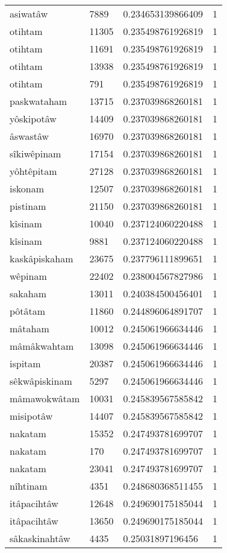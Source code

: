 \begin{longtable}{llll}
asiwatâw & 7889 & 0.234653139866409 & 1 \\
otihtam & 11305 & 0.235498761926819 & 1 \\
otihtam & 11691 & 0.235498761926819 & 1 \\
otihtam & 13938 & 0.235498761926819 & 1 \\
otihtam & 791 & 0.235498761926819 & 1 \\
paskwataham & 13715 & 0.237039868260181 & 1 \\
yôskipotâw & 14409 & 0.237039868260181 & 1 \\
âswastâw & 16970 & 0.237039868260181 & 1 \\
sîkiwêpinam & 17154 & 0.237039868260181 & 1 \\
yôhtêpitam & 27128 & 0.237039868260181 & 1 \\
iskonam & 12507 & 0.237039868260181 & 1 \\
pistinam & 21150 & 0.237039868260181 & 1 \\
kîsinam & 10040 & 0.237124060220488 & 1 \\
kîsinam & 9881 & 0.237124060220488 & 1 \\
kaskâpiskaham & 23675 & 0.237796111899651 & 1 \\
wêpinam & 22402 & 0.238004567827986 & 1 \\
sakaham & 13011 & 0.240384500456401 & 1 \\
pôtâtam & 11860 & 0.244896064891707 & 1 \\
mâtaham & 10012 & 0.245061966634446 & 1 \\
mâmâkwahtam & 13098 & 0.245061966634446 & 1 \\
ispitam & 20387 & 0.245061966634446 & 1 \\
sêkwâpiskinam & 5297 & 0.245061966634446 & 1 \\
mâmawokwâtam & 10031 & 0.245839567585842 & 1 \\
misipotâw & 14407 & 0.245839567585842 & 1 \\
nakatam & 15352 & 0.247493781699707 & 1 \\
nakatam & 170 & 0.247493781699707 & 1 \\
nakatam & 23041 & 0.247493781699707 & 1 \\
nîhtinam & 4351 & 0.248680368511455 & 1 \\
itâpacihtâw & 12648 & 0.249690175185044 & 1 \\
itâpacihtâw & 13650 & 0.249690175185044 & 1 \\
sâkaskinahtâw & 4435 & 0.25031897196456 & 1 \\

\end{longtable}
